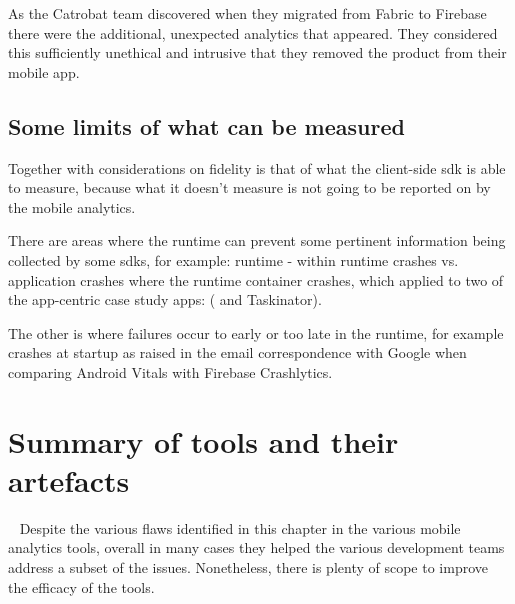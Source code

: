 As the Catrobat team discovered when they migrated from Fabric to Firebase there were the additional, unexpected analytics that appeared. They considered this sufficiently unethical and intrusive that they removed the product from their mobile app.


\subsection{Some limits of what can be measured}
Together with considerations on fidelity is that of what the client-side \Gls{sdk} is able to measure, because what it doesn't measure is not going to be reported on by the mobile analytics. 

There are areas where the runtime can prevent some pertinent information being collected by some \Glspl{sdk}, for example:  runtime - within runtime crashes vs. application crashes where the runtime container crashes, which applied to two of the app-centric case study apps: ( and Taskinator).

The other is where failures occur to early or too late in the runtime, for example crashes at startup as raised in the email correspondence with Google when comparing Android Vitals with Firebase Crashlytics.


\section{Summary of tools and their artefacts}~\label{tata-summary-section}
Despite the various flaws identified in this chapter in the various mobile analytics tools, overall in many cases they helped the various development teams address a subset of the issues. Nonetheless, there is plenty of scope to improve the efficacy of the tools.
